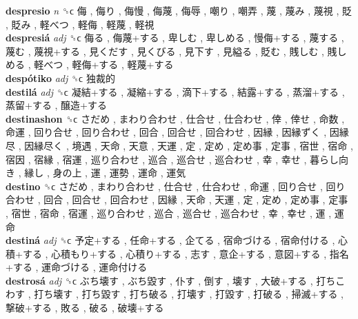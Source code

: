 \textbf{despresio} \emph{n}  ␝ϲ   侮 ,  侮り ,  侮慢 ,  侮蔑 ,  侮辱 ,  嘲り ,  嘲弄 ,  蔑 ,  蔑み ,  蔑視 ,  貶 ,  貶み ,  軽べつ ,  軽侮 ,  軽蔑 ,  軽視   \\
\textbf{despresiá} \emph{adj}  ␝ϲ   侮る ,  侮蔑+する ,  卑しむ ,  卑しめる ,  慢侮+する ,  蔑する ,  蔑む ,  蔑視+する ,  見くだす ,  見くびる ,  見下す ,  見縊る ,  貶む ,  賎しむ ,  賎しめる ,  軽べつ ,  軽侮+する ,  軽蔑+する   \\
\textbf{despótiko} \emph{adj}  ␝ϲ   独裁的   \\
\textbf{destilá} \emph{adj}  ␝ϲ   凝結+する ,  凝縮+する ,  滴下+する ,  結露+する ,  蒸溜+する ,  蒸留+する ,  醸造+する   \\
\textbf{destinashon} ␝ϲ   さだめ ,  まわり合わせ ,  仕合せ ,  仕合わせ ,  倖 ,  倖せ ,  命数 ,  命運 ,  回り合せ ,  回り合わせ ,  回合 ,  回合せ ,  回合わせ ,  因縁 ,  因縁ずく ,  因縁尽 ,  因縁尽く ,  境遇 ,  天命 ,  天意 ,  天運 ,  定 ,  定め ,  定め事 ,  定事 ,  宿世 ,  宿命 ,  宿因 ,  宿縁 ,  宿運 ,  巡り合わせ ,  巡合 ,  巡合せ ,  巡合わせ ,  幸 ,  幸せ ,  暮らし向き ,  縁し ,  身の上 ,  運 ,  運勢 ,  運命 ,  運気   \\
\textbf{destino} ␝ϲ   さだめ ,  まわり合わせ ,  仕合せ ,  仕合わせ ,  命運 ,  回り合せ ,  回り合わせ ,  回合 ,  回合せ ,  回合わせ ,  因縁 ,  天命 ,  天運 ,  定 ,  定め ,  定め事 ,  定事 ,  宿世 ,  宿命 ,  宿運 ,  巡り合わせ ,  巡合 ,  巡合せ ,  巡合わせ ,  幸 ,  幸せ ,  運 ,  運命   \\
\textbf{destiná} \emph{adj}  ␝ϲ   予定+する ,  任命+する ,  企てる ,  宿命づける ,  宿命付ける ,  心積+する ,  心積もり+する ,  心積り+する ,  志す ,  意企+する ,  意図+する ,  指名+する ,  運命づける ,  運命付ける   \\
\textbf{destrosá} \emph{adj}  ␝ϲ   ぶち壊す ,  ぶち毀す ,  仆す ,  倒す ,  壊す ,  大破+する ,  打ちこわす ,  打ち壊す ,  打ち毀す ,  打ち破る ,  打壊す ,  打毀す ,  打破る ,  掃滅+する ,  撃破+する ,  敗る ,  破る ,  破壊+する   \\
